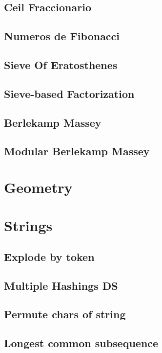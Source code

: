 \subsection{Ceil Fraccionario}
\subsection{Numeros de Fibonacci}
\subsection{Sieve Of Eratosthenes}
\subsection{Sieve-based Factorization}
\subsection{Berlekamp Massey}
\subsection{Modular Berlekamp Massey}

\section{Geometry}


\section{Strings}
\subsection{Explode by token}
\subsection{Multiple Hashings DS}
\subsection{Permute chars of string}
\subsection{Longest common subsequence}
